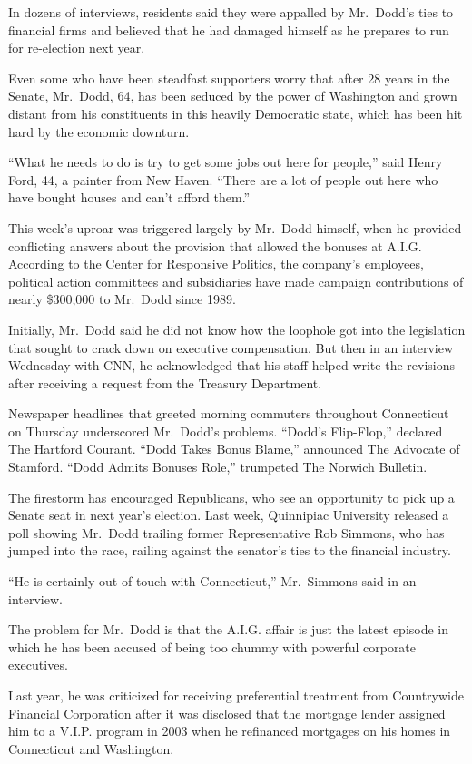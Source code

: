 \documentclass[12pt,a4paper,onecolumn]{article}
\begin{document}
\begin{CJK*}{GBK}{song}
In dozens of interviews, residents said they were appalled by Mr.~Dodd's ties to financial firms and
believed that he had damaged himself as he prepares to run for re-election next year.

Even some who have been steadfast supporters worry that after 28 years in the Senate, Mr.~Dodd, 64,
has been seduced by the power of Washington and grown distant from his constituents in this heavily
Democratic state, which has been hit hard by the economic downturn.

``What he needs to do is try to get some jobs out here for people,'' said Henry Ford, 44, a painter
from New Haven. ``There are a lot of people out here who have bought houses and can't afford them.''

This week's uproar was triggered largely by Mr.~Dodd himself, when he provided conflicting answers
about the provision that allowed the bonuses at A.I.G. According to the Center for Responsive
Politics, the company's employees, political action committees and subsidiaries have made campaign
contributions of nearly \$300,000 to Mr.~Dodd since 1989.

Initially, Mr.~Dodd said he did not know how the loophole got into the legislation that sought to
crack down on executive compensation. But then in an interview Wednesday with CNN, he acknowledged
that his staff helped write the revisions after receiving a request from the Treasury Department.

Newspaper headlines that greeted morning commuters throughout Connecticut on Thursday underscored
Mr.~Dodd's problems. ``Dodd's Flip-Flop,'' declared The Hartford Courant. ``Dodd Takes Bonus
Blame,'' announced The Advocate of Stamford. ``Dodd Admits Bonuses Role,'' trumpeted The Norwich
Bulletin.

The firestorm has encouraged Republicans, who see an opportunity to pick up a Senate seat in next
year's election. Last week, Quinnipiac University released a poll showing Mr.~Dodd trailing former
Representative Rob Simmons, who has jumped into the race, railing against the senator's ties to the
financial industry.

``He is certainly out of touch with Connecticut,'' Mr.~Simmons said in an interview.

The problem for Mr.~Dodd is that the A.I.G. affair is just the latest episode in which he has been
accused of being too chummy with powerful corporate executives.

Last year, he was criticized for receiving preferential treatment from Countrywide Financial
Corporation after it was disclosed that the mortgage lender assigned him to a V.I.P. program in 2003
when he refinanced mortgages on his homes in Connecticut and Washington.


\end{CJK*}
\end{document}
